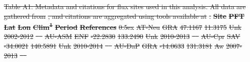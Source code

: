 \documentclass[hess, manuscript]{copernicus}
\providecommand{\DIFdeltex}[1]{{\protect\color{red}\sout{#1}}}                      %
\providecommand{\DIFdel}[1]{\texorpdfstring{\DIFdeltex{#1}}{}} %
\begin{document}

\DIFdel{Table A1: Metadata and citations for flux sites used in this analysis. All data are gathered from }%
\DIFdel{, and citations are aggregated using tools available at }%
\DIFdel{.
}%
\textbf{\DIFdel{Site}} %
\textbf{\DIFdel{PFT}} %
\textbf{\DIFdel{Lat}} %
\textbf{\DIFdel{Lon}} %
\textbf{\DIFdel{Clim\textsuperscript{1}}} %
\textbf{\DIFdel{Period}} %
\textbf{\DIFdel{References}} %
\DIFdel{0.5ex}%
\DIFdel{AT-Neu }%
\DIFdel{GRA }%
\DIFdel{47.1167 }%
\DIFdel{11.3175 }%
\DIFdel{Unk }%
\DIFdel{2002-2012 }%
\DIFdel{\mbox{%
\cite{AT-Neu} }%
}%
\DIFdel{AU-ASM }%
\DIFdel{ENF }%
\DIFdel{-22.2830 }%
\DIFdel{133.2490 }%
\DIFdel{Unk }%
\DIFdel{2010-2013 }%
\DIFdel{\mbox{%
\cite{AU-ASM} }%
}%
\DIFdel{AU-Cpr }%
\DIFdel{SAV }%
\DIFdel{-34.0021 }%
\DIFdel{140.5891 }%
\DIFdel{Unk }%
\DIFdel{2010-2014 }%
\DIFdel{\mbox{%
\cite{AU-Cpr} }%
}%
\DIFdel{AU-DaP }%
\DIFdel{GRA }%
\DIFdel{-14.0633 }%
\DIFdel{131.3181 }%
\DIFdel{Aw  }%
\DIFdel{2007-2013 }%
\DIFdel{\mbox{%
\cite{AU-DaP} }%
}%
\end{document}
